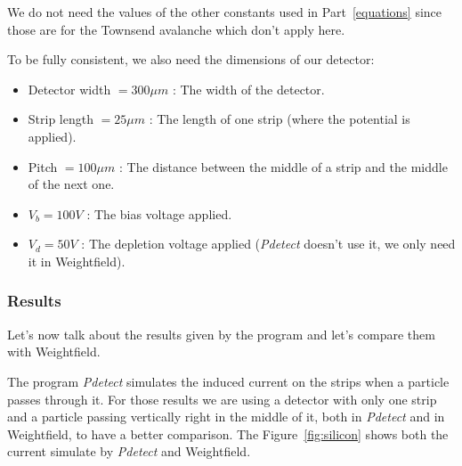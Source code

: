 \documentclass[11pt]{article}
\begin{document}
				We do not need the values of the other constants used in Part~\ref{equations} since
				those are for the Townsend avalanche which don't apply here.

				To be fully consistent, we also need the dimensions of our detector:

				\begin{itemize}

					\item Detector width $= 300 \mu m$ : The width of the detector.
					\item Strip length $= 25 \mu m$ : The length of one strip (where the potential is
						applied).
					\item Pitch $= 100 \mu m$ : The distance between the middle of a strip and the middle
						of the next one.
					\item $V_b = 100 V$ : The bias voltage applied.
					\item $V_d = 50 V$ : The depletion voltage applied (\textit{Pdetect} doesn't use it, we only
						need it in Weightfield).

				\end{itemize}

			\subsubsection*{Results}

				Let's now talk about the results given by the program and let's compare them with Weightfield.

				The program \textit{Pdetect} simulates the induced current on the strips when a particle passes through it.
				For those results we are using a detector with only one strip and a particle passing vertically right in
				the middle of it, both in \textit{Pdetect} and in Weightfield, to have a better comparison. The
				Figure~\ref{fig:silicon} shows both the current simulate by \textit{Pdetect} and Weightfield.
\end{document}

